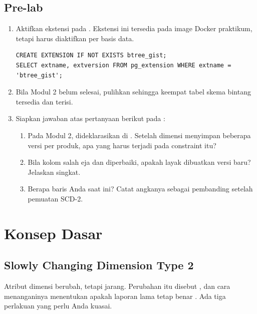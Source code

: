 \subsection{Pre-lab}

\begin{enumerate}[leftmargin=1.4em]
  \item Aktifkan ekstensi  pada .
        Ekstensi ini tersedia pada image Docker praktikum, tetapi harus
        diaktifkan per basis data.
\begin{lstlisting}[style=sqlgaya]
CREATE EXTENSION IF NOT EXISTS btree_gist;
SELECT extname, extversion FROM pg_extension WHERE extname = 'btree_gist';
\end{lstlisting}
  \item Bila Modul 2 belum selesai, pulihkan 
        sehingga keempat tabel skema bintang tersedia dan terisi.
  \item Siapkan jawaban atas pertanyaan berikut pada
        :
  \begin{enumerate}[label=\alph*.,leftmargin=1.4em]
    \item Pada Modul 2,  dideklarasikan 
          di . Setelah dimensi menyimpan beberapa versi
          per produk, apa yang harus terjadi pada constraint itu?
    \item Bila kolom  salah eja dan diperbaiki, apakah
          layak dibuatkan versi baru? Jelaskan singkat.
    \item Berapa baris  Anda saat ini? Catat angkanya
          sebagai pembanding setelah pemuatan SCD-2.
  \end{enumerate}
\end{enumerate}

\section{Konsep Dasar}

\subsection{Slowly Changing Dimension Type 2}

Atribut dimensi berubah, tetapi jarang. Perubahan itu disebut , dan cara menanganinya menentukan apakah laporan lama tetap benar
\citep{kimball2013}. Ada tiga perlakuan yang perlu Anda kuasai.


